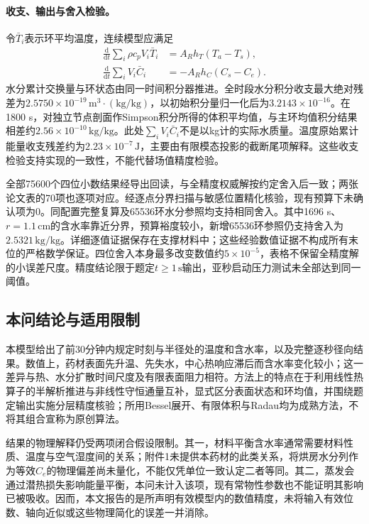 \paragraph{收支、输出与舍入检验。}
令$\bar T_i$表示环平均温度，连续模型应满足
\begin{equation}
\begin{aligned}
\frac{\mathrm d}{\mathrm dt}\sum_i\rho c_pV_i\bar T_i
 &=A_Rh_T(T_a-T_s),\\
\frac{\mathrm d}{\mathrm dt}\sum_iV_i\bar C_i
 &=-A_Rh_C(C_s-C_e).
\end{aligned}
\label{eq:q1-balance}
\end{equation}
水分累计交换量与环状态由同一时间积分器推进。全时段水分积分收支最大绝对残差为$2.5750\times10^{-19}\,\mathrm{m^3\cdot(kg/kg)}$，以初始积分量归一化后为$3.2143\times10^{-16}$。在1800 s，对独立节点剖面作Simpson积分所得的体积平均值，与主环均值积分结果相差约$2.56\times10^{-10}\,\mathrm{kg/kg}$。此处$\sum_i V_i\bar C_i$不是以kg计的实际水质量。温度原始累计能量收支残差约为$2.23\times10^{-7}\,\mathrm J$，主要由有限模态投影的截断尾项解释。这些收支检验支持实现的一致性，不能代替场值精度检验。

全部75600个四位小数结果经导出回读，与全精度权威解按约定舍入后一致；两张论文表的70项也逐项对应。经逐点分界扫描与敏感位置精化核验，现有预算下未确认项为0。同配置完整复算及65536环水分参照均支持相同舍入。其中1696 s、$r=1.1\,\mathrm{cm}$的含水率靠近分界，预算裕度较小，新增65536环参照仍支持舍入为$2.5321\,\mathrm{kg/kg}$。详细逐值证据保存在支撑材料中；这些经验数值证据不构成所有末位的严格数学保证。四位舍入本身最多改变数值约$5\times10^{-5}$，表格不保留全精度解的小误差尺度。精度结论限于题定$t\ge1\,\mathrm s$输出，亚秒启动压力测试未全部达到同一阈值。

\pagebreak[0]
\begin{samepage}
\subsection{本问结论与适用限制}

本模型给出了前30分钟内规定时刻与半径处的温度和含水率，以及完整逐秒径向结果。数值上，药材表面先升温、先失水，中心热响应滞后而含水率变化较小；这一差异与热、水分扩散时间尺度及有限表面阻力相符。方法上的特点在于利用线性热算子的半解析推进与非线性守恒通量互补，显式区分表面状态和环均值，并围绕题定输出实施分层精度核验；所用Bessel展开、有限体积与Radau均为成熟方法，不将其组合宣称为原创算法。
\par
\end{samepage}

结果的物理解释仍受两项闭合假设限制。其一，材料平衡含水率通常需要材料性质、温度与空气湿度间的关系\cite{q1-fao}；附件1未提供本药材的此类关系，将烘房水分列作为等效$C_e$的物理偏差尚未量化，不能仅凭单位一致认定二者等同。其二，蒸发会通过潜热损失影响能量平衡\cite{q1-evaporation}，本问未计入该项，现有常物性参数也不能证明其影响已被吸收。因而，本文报告的是所声明有效模型内的数值精度，未将输入有效位数、轴向近似或这些物理简化的误差一并消除。
